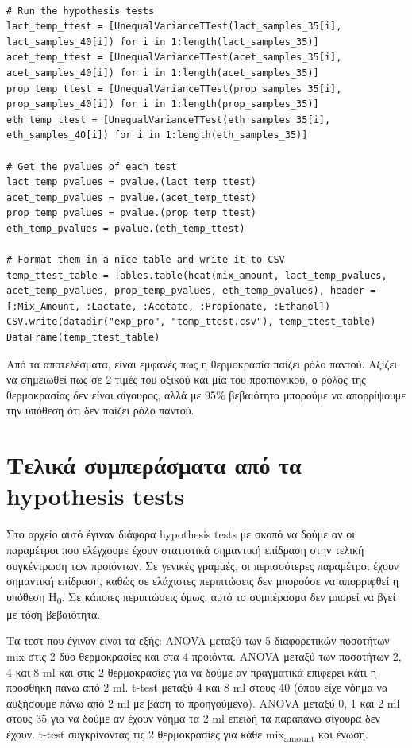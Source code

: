 \documentclass[11pt]{article}
\begin{document}
\begin{verbatim}

# Run the hypothesis tests
lact_temp_ttest = [UnequalVarianceTTest(lact_samples_35[i], lact_samples_40[i]) for i in 1:length(lact_samples_35)]
acet_temp_ttest = [UnequalVarianceTTest(acet_samples_35[i], acet_samples_40[i]) for i in 1:length(acet_samples_35)]
prop_temp_ttest = [UnequalVarianceTTest(prop_samples_35[i], prop_samples_40[i]) for i in 1:length(prop_samples_35)]
eth_temp_ttest = [UnequalVarianceTTest(eth_samples_35[i], eth_samples_40[i]) for i in 1:length(eth_samples_35)]

# Get the pvalues of each test
lact_temp_pvalues = pvalue.(lact_temp_ttest)
acet_temp_pvalues = pvalue.(acet_temp_ttest)
prop_temp_pvalues = pvalue.(prop_temp_ttest)
eth_temp_pvalues = pvalue.(eth_temp_ttest)

# Format them in a nice table and write it to CSV
temp_ttest_table = Tables.table(hcat(mix_amount, lact_temp_pvalues, acet_temp_pvalues, prop_temp_pvalues, eth_temp_pvalues), header = [:Mix_Amount, :Lactate, :Acetate, :Propionate, :Ethanol])
CSV.write(datadir("exp_pro", "temp_ttest.csv"), temp_ttest_table)
DataFrame(temp_ttest_table)
\end{verbatim}

Από τα αποτελέσματα, είναι εμφανές πως η θερμοκρασία παίζει ρόλο παντού. Αξίζει να σημειωθεί πως σε 2 τιμές του οξικού και μία του προπιονικού, ο ρόλος της θερμοκρασίας δεν είναι σίγουρος, αλλά με 95\% βεβαιότητα μπορούμε να απορρίψουμε την υπόθεση ότι δεν παίζει ρόλο παντού.

\section{Τελικά συμπεράσματα από τα hypothesis tests}
\label{sec:orgffcde19}
Στο αρχείο αυτό έγιναν διάφορα hypothesis tests με σκοπό να δούμε αν οι παραμέτροι που ελέγχουμε έχουν στατιστικά σημαντική επίδραση στην τελική συγκέντρωση των προιόντων. Σε γενικές γραμμές, οι περισσότερες παραμέτροι έχουν σημαντική επίδραση, καθώς σε ελάχιστες περιπτώσεις δεν μπορούσε να απορριφθεί η υπόθεση H\textsubscript{0}. Σε κάποιες περιπτώσεις όμως, αυτό το συμπέρασμα δεν μπορεί να βγεί με τόση βεβαιότητα.

Τα τεστ που έγιναν είναι τα εξής: ANOVA μεταξύ των 5 διαφορετικών ποσοτήτων mix στις 2 δύο θερμοκρασίες και στα 4 προιόντα. ANOVA μεταξύ των ποσοτήτων 2, 4 και 8 ml και στις 2 θερμοκρασίες για να δούμε αν πραγματικά επιφέρει κάτι η προσθήκη πάνω από 2 ml. t-test μεταξύ 4 και 8 ml στους 40 (όπου είχε νόημα να αυξήσουμε πάνω από 2 ml με βάση το προηγούμενο). ANOVA μεταξύ 0, 1 και 2 ml στους 35 για να δούμε αν έχουν νόημα τα 2 ml επειδή τα παραπάνω σίγουρα δεν έχουν. t-test συγκρίνοντας τις 2 θερμοκρασίες για κάθε mix\textsubscript{amount} και ένωση.
\end{document}
